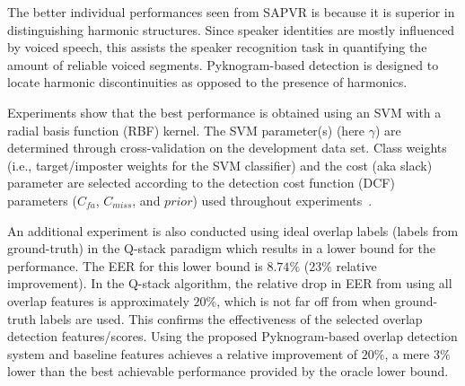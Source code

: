 \vspace{0mm}

The better individual performances seen from SAPVR is because it is superior in distinguishing harmonic structures. 
Since speaker identities are mostly influenced by voiced speech, this assists the speaker recognition task in quantifying the amount of reliable voiced segments. 
Pyknogram-based detection is designed to locate harmonic discontinuities as opposed to the presence of harmonics. 

Experiments show that the best performance is obtained using an SVM with a radial basis function (RBF) kernel. 
The SVM parameter(s) (here $\gamma$) are determined through cross-validation on the development data set. 
Class weights (i.e., target/imposter weights for the SVM classifier) and the cost (aka slack) parameter are selected according to the detection cost function (DCF) parameters ($C_{fa}$, $C_{miss}$, and $prior$) used throughout experiments~\cite{bosaris}. %

An additional experiment is also conducted using ideal overlap labels (labels from ground-truth) in the Q-stack paradigm which results in a lower bound for the performance. The EER for this lower bound is $8.74\%$ ($23\%$ relative improvement). 
In the Q-stack algorithm, the relative drop in EER from using all overlap features is approximately $20\%$, which is not far off from when ground-truth labels are used. 
This confirms the effectiveness of the selected overlap detection features/scores.  
Using the proposed Pyknogram-based overlap detection system and baseline features achieves a relative improvement of $20\%$, a mere $3\%$ lower than the best achievable performance provided by the oracle lower bound.


